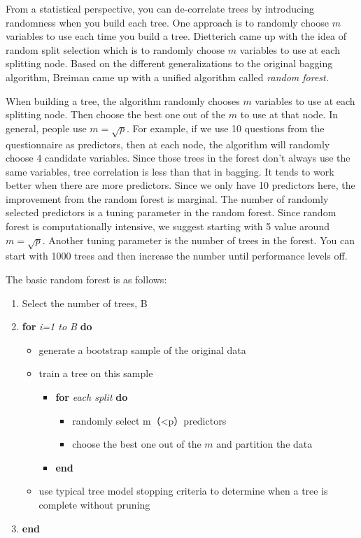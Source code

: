 \documentclass[12pt,]{krantz}
\providecommand{\tightlist}{%
  \setlength{\itemsep}{0pt}\setlength{\parskip}{0pt}}
\begin{document}
From a statistical perspective, you can de-correlate trees by introducing randomness when you build each tree. One approach \citep{Ho1998, amit1997} is to randomly choose \(m\) variables to use each time you build a tree. Dietterich\citep{Dietterich2000} came up with the idea of random split selection which is to randomly choose \(m\) variables to use at each splitting node. Based on the different generalizations to the original bagging algorithm, Breiman \citep{Breiman2001} came up with a unified algorithm called \emph{random forest.}

When building a tree, the algorithm randomly chooses \(m\) variables to use at each splitting node. Then choose the best one out of the \(m\) to use at that node. In general, people use \(m=\sqrt{p}\). For example, if we use 10 questions from the questionnaire as predictors, then at each node, the algorithm will randomly choose 4 candidate variables. Since those trees in the forest don't always use the same variables, tree correlation is less than that in bagging. It tends to work better when there are more predictors. Since we only have 10 predictors here, the improvement from the random forest is marginal. The number of randomly selected predictors is a tuning parameter in the random forest. Since random forest is computationally intensive, we suggest starting with 5 value around \(m=\sqrt{p}\). Another tuning parameter is the number of trees in the forest. You can start with 1000 trees and then increase the number until performance levels off.

The basic random forest is as follows:

\begin{enumerate}
\def\labelenumi{\arabic{enumi}.}
\tightlist
\item
  Select the number of trees, B
\item
  \textbf{for} \emph{i=1 to B} \textbf{do}

  \begin{itemize}
  \tightlist
  \item
    generate a bootstrap sample of the original data
  \item
    train a tree on this sample

    \begin{itemize}
    \tightlist
    \item
      \textbf{for} \emph{each split} \textbf{do}

      \begin{itemize}
      \tightlist
      \item
        randomly select m（\textless{}p）predictors
      \item
        choose the best one out of the \(m\) and partition the data
      \end{itemize}
    \item
      \textbf{end}
    \end{itemize}
  \item
    use typical tree model stopping criteria to determine when a tree is complete without pruning
  \end{itemize}
\item
  \textbf{end}
\end{enumerate}
\end{document}
